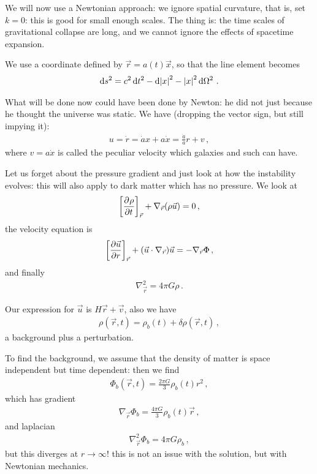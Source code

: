 \documentclass[main.tex]{subfiles}
\begin{document}
We will now use a Newtonian approach: we ignore spatial curvature, that is, set \(k=0\): this is good for small enough scales. The thing is: the time scales of gravitational collapse are long, and we cannot ignore the effects of spacetime expansion. 

We use a coordinate defined by \(\vec{r} = a(t) \vec{x}\), so that the line element becomes 
%
\begin{align}
  \dd{s^2} = c^2 \dd{t^2} - \dd{\abs{x}^2} - 
\abs{x}^2 \dd{\Omega^2}
\,. 
\end{align}
%

What will be done now could have been done by Newton: he did not just because he thought the universe was static. We have (dropping the vector sign, but still impying it): 
%
\begin{align}
  u = \dot{r} = \dot{a} x + a \dot{x} 
  = \frac{\dot{a}}{a} r + v
\,,
\end{align}
%
where \(v = a \dot{x}\) is called the peculiar velocity which galaxies and such can have.  

Let us forget about the pressure gradient and just look at how the instability evolves: this will also apply to dark matter which has no pressure. We look at 
%
\begin{align}
  \qty[\pdv[]{\rho }{t} ]_{\vec{r}} + \nabla_{\vec{r}} \qty(\rho \vec{u}) = 0 
\,,
\end{align}
%
the velocity equation is 
%
\begin{align}
  \qty[\pdv{\vec{u}}{r}]_{\vec{r}} + \qty(\vec{u} \cdot \nabla_{\vec{r}}) \vec{u} = - \nabla_{\vec{r}} \Phi 
\,,
\end{align}
%
and finally 
%
\begin{align}
  \nabla^2_{\vec{r}} = 4 \pi G \rho 
\,.
\end{align}

Our expression for \(\vec{u}\) is \(H \vec{r} + \vec{v}\), also we have 
%
\begin{align}
  \rho (\vec{r}, t) = \rho_{b} (t) + \delta \rho (\vec{r}, t)
\,,
\end{align}
%
a background plus a perturbation. 

To find the background, we assume that the density of matter is space independent but time dependent: then we find 
%
\begin{align}
  \Phi_{b } (\vec{r}, t) = \frac{2 \pi G}{3} \rho_{b} (t) r^2
\,,
\end{align}
%
which has gradient 
%
\begin{align}
  \nabla_{\vec{r}} \Phi_{b} = \frac{4 \pi G}{3} \rho_b (t) \vec{r} 
\,,
\end{align}
%
and laplacian 
%
\begin{align}
  \nabla^2_{\vec{r}} \Phi_{b} = 4 \pi G \rho_b
\,,
\end{align}
%
but this diverges at \(r \rightarrow \infty\)! this is not an issue with the solution, but with Newtonian mechanics. 
\end{document}
